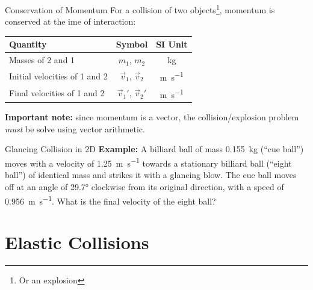 \documentclass[12pt,compress,aspectratio=169]{beamer}
\begin{document}
\begin{frame}{Conservation of Momentum}
  For a collision of two objects\footnote{Or an explosion}, momentum is
  conserved at the ime of interaction:
  
  \begin{center}
    \begin{tabular}{l|c|c}
      \rowcolor{pink}
      \textbf{Quantity} & \textbf{Symbol} & \textbf{SI Unit} \\ \hline
      Masses of 2 and 1 & $m_1$, $m_2$ & \si{\kilo\gram} \\
      Initial velocities of 1 and 2 & $\vec v_1$, $\vec v_2$ &
      \si{\metre\per\second} \\
      Final velocities of 1 and 2 & $\vec v_1'$, $\vec v_2'$ &
      \si{\metre\per\second}
    \end{tabular}
  \end{center}
  \textbf{Important note:} since momentum is a vector, the collision/explosion
  problem \emph{must} be solve using vector arithmetic.
\end{frame}



\begin{frame}{Glancing Collision in 2D}
  \vspace{.3in}\textbf{Example:} A billiard ball of mass \SI{.155}{\kilo\gram}
  (``cue ball'') moves with a velocity of \SI{1.25}{\metre\per\second} towards
  a stationary billiard ball (``eight ball'') of identical mass and strikes it
  with a glancing blow. The cue ball moves off at an angle of \ang{29.7}
  clockwise from its original direction, with a speed of
  \SI{.956}{\metre\per\second}. What is the final velocity of the eight ball?
\end{frame}



\section{Elastic Collisions}
\end{document}
